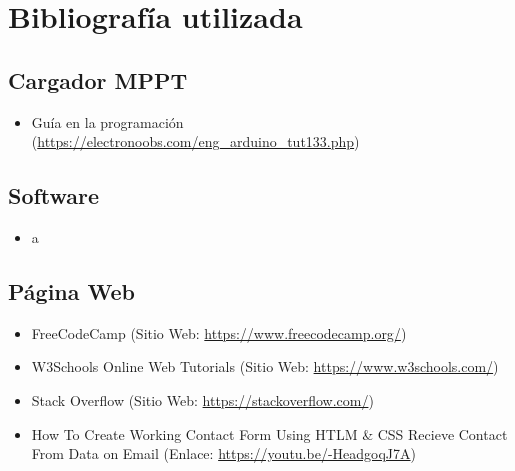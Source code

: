 \chapter{Bibliografía utilizada}
    
        \section{Cargador MPPT}
        
            \begin{itemize} [label=•]
                \setlength{\itemindent}{3em}
                \item Guía en la programación (\href{https://electronoobs.com/eng_arduino_tut133.php}{https://electronoobs.com/eng\_arduino\_tut133.php})
            \end{itemize}
            
        \section{Software}
        
            \begin{itemize} [label=•]
                \setlength{\itemindent}{3em}
                \item a
            \end{itemize}
            
        \section{Página Web}
        
            \begin{itemize} [label=•]
                \setlength{\itemindent}{3em}
                \item FreeCodeCamp (Sitio Web: \href{https://www.freecodecamp.org/}{https://www.freecodecamp.org/})
                \item W3Schools Online Web Tutorials (Sitio Web: \href{https://www.w3schools.com/}{https://www.w3schools.com/})
                \item Stack Overflow (Sitio Web: \href{https://stackoverflow.com/}{https://stackoverflow.com/})
                \item How To Create Working Contact Form Using HTLM \& CSS Recieve Contact From Data on Email (Enlace: \href{https://youtu.be/-HeadgoqJ7A}{https://youtu.be/-HeadgoqJ7A})
            \end{itemize}
            
